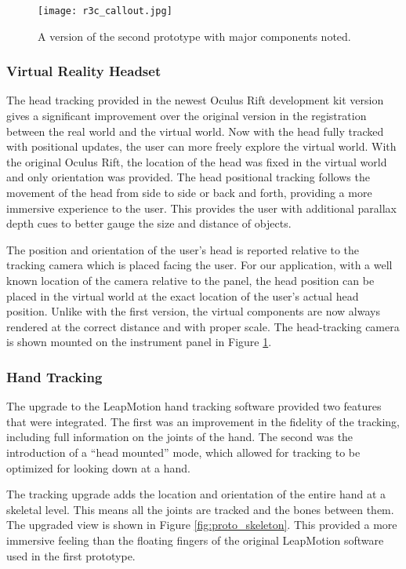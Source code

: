 \begin{figure}
    \centering
    \texttt{[image: r3c\_callout.jpg]}
    \caption{A version of the second prototype with major components noted.}
    \label{fig:r3c_callout}
\end{figure}

\subsubsection{Virtual Reality Headset}

The head tracking provided in the newest Oculus Rift development kit version gives a significant improvement over the original version in the registration between the real world and the virtual world.
Now with the head fully tracked with positional updates, the user can more freely explore the virtual world.
With the original Oculus Rift, the location of the head was fixed in the virtual world and only orientation was provided.
The head positional tracking follows the movement of the head from side to side or back and forth, providing a more immersive experience to the user.
This provides the user with additional parallax depth cues to better gauge the size and distance of objects.

The position and orientation of the user's head is reported relative to the tracking camera which is placed facing the user.
For our application, with a well known location of the camera relative to the panel, the head position can be placed in the virtual world at the exact location of the user's actual head position.
Unlike with the first version, the virtual components are now always rendered at the correct distance and with proper scale.
The head-tracking camera is shown mounted on the instrument panel in Figure \ref{fig:r3c_callout}.


\subsubsection{Hand Tracking}

The upgrade to the LeapMotion hand tracking software provided two features that were integrated.
The first was an improvement in the fidelity of the tracking, including full information on the joints of the hand.
The second was the introduction of a ``head mounted'' mode, which allowed for tracking to be optimized for looking down at a hand.

The tracking upgrade adds the location and orientation of the entire hand at a skeletal level.
This means all the joints are tracked and the bones between them.
The upgraded view is shown in Figure \ref{fig:proto_skeleton}.
This provided a more immersive feeling than the floating fingers of the original LeapMotion software used in the first prototype.

